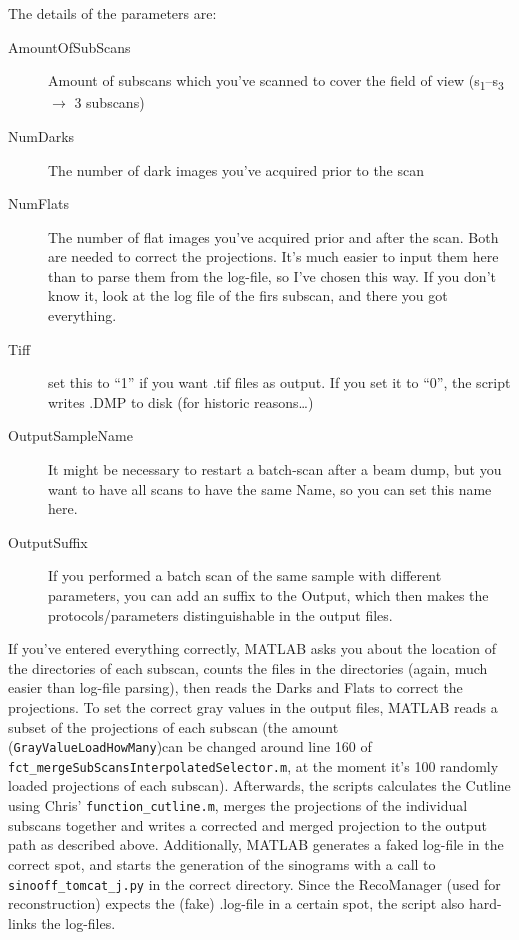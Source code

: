 \documentclass[a4paper]{scrartcl}
\begin{document}
The details of the parameters are:
\begin{description}
	\item [AmountOfSubScans] Amount of subscans which you've scanned to cover the field of view (s\textsubscript{1}--s\textsubscript{3} $\rightarrow$ 3 subscans)
	\item [NumDarks] The number of dark images you've acquired prior to the scan
	\item [NumFlats] The number of flat images you've acquired prior and after the scan. Both are needed to correct the projections. It's much easier to input them here than to parse them from the log-file, so I've chosen this way. If you don't know it, look at the log file of the firs subscan, and there you got everything.
	\item [Tiff] set this to ``1'' if you want .tif files as output. If you set it to ``0'', the script writes .DMP to disk (for historic reasons\ldots)
	\item [OutputSampleName] It might be necessary to restart a batch-scan after a beam dump, but you want to have all scans to have the same Name, so you can set this name here.
	\item [OutputSuffix] If you performed a batch scan of the same sample with different parameters, you can add an suffix to the Output, which then makes the protocols/parameters distinguishable in the output files.
\end{description}

If you've entered everything correctly, MATLAB asks you about the location of the directories of each subscan, counts the files in the directories (again, much easier than log-file parsing), then reads the Darks and Flats to correct the projections. To set the correct gray values in the output files, MATLAB reads a subset of the projections of each subscan (the amount (\verb+GrayValueLoadHowMany+)can be changed around line 160 of \verb+fct_mergeSubScansInterpolatedSelector.m+, at the moment it's 100 randomly loaded projections of each subscan). Afterwards, the scripts calculates the Cutline using Chris' \verb+function_cutline.m+, merges the projections of the individual subscans together and writes a corrected and merged projection to the output path as described above. Additionally, MATLAB generates a faked log-file in the correct spot, and starts the generation of the sinograms with a call to \verb+sinooff_tomcat_j.py+ in the correct directory. Since the RecoManager (used for reconstruction) expects the (fake) .log-file in a certain spot, the script also hard-links the log-files.
\end{document}
